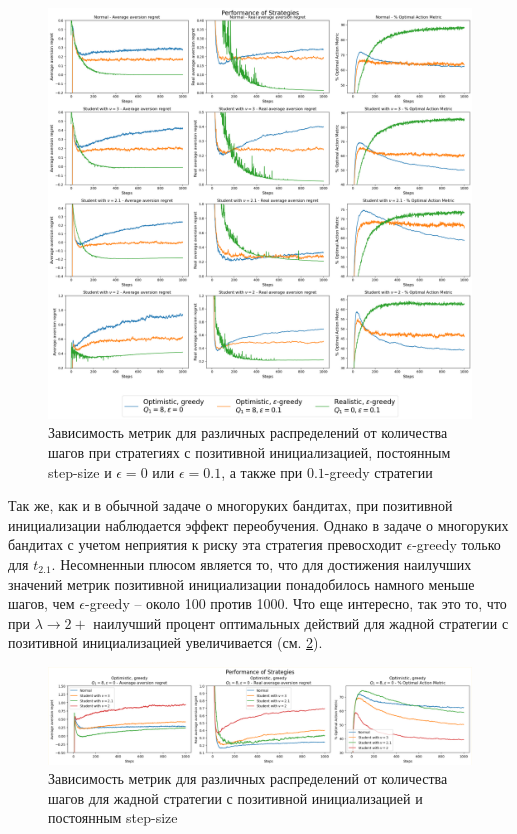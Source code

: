 \begin{figure}[ht!] %
\centering
\includegraphics[width=6in]{theory_tester/theory_images/positive_init/one_distr.png}
\caption{Зависимость метрик для различных распределений от количества шагов при стратегиях с позитивной инициализацией, постоянным step-size и $\epsilon=0$ или $\epsilon=0.1$, а также при $0.1$-greedy стратегии}
\label{fig:positive_init_one_distr}
\end{figure}

Так же, как и в обычной задаче о многоруких бандитах, при позитивной инициализации наблюдается эффект переобучения. Однако в задаче о многоруких бандитах с учетом неприятия к риску эта стратегия превосходит $\epsilon$-greedy только для $t_{2.1}$. Несомненныи плюсом является то, что для достижения наилучших значений метрик позитивной инициализации понадобилось намного меньше шагов, чем $\epsilon$-greedy -- около 100 против 1000. Что еще интересно, так это то, что при $\lambda \to 2+$ наилучший процент оптимальных действий для жадной стратегии с позитивной инициализацией увеличивается (см. \ref{fig:positive_init_one_strat_positive_greedy}).

\begin{figure}[ht!] %
\centering
\includegraphics[width=6in]{theory_tester/theory_images/positive_init/one_strat_positive_greedy.png}
\caption{Зависимость метрик для различных распределений от количества шагов для жадной стратегии с позитивной инициализацией и постоянным step-size}
\label{fig:positive_init_one_strat_positive_greedy}
\end{figure}

